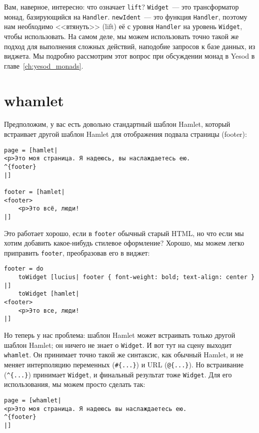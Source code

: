 \begin{remark}
Вам, наверное, интересно: что означает \lstinline'lift'? \lstinline'Widget'~--- это трансформатор монад, базирующийся на \lstinline'Handler'. \lstinline'newIdent'~--- это функция \lstinline'Handler', поэтому нам необходимо <<втянуть>> (lift) её с уровня \lstinline'Handler' на уровень \lstinline'Widget', чтобы использовать. На самом деле, мы можем использовать точно такой же подход для выполнения сложных действий, наподобие запросов к базе данных, из виджета. Мы подробно рассмотрим этот вопрос при обсуждении монад в Yesod в главе~\ref{ch:yesod_monads}.
\end{remark}

\section{whamlet}

Предположим, у вас есть довольно стандартный шаблон Hamlet, который встраивает другой шаблон Hamlet для отображения подвала страницы (footer):

\begin{lstlisting}
page = [hamlet|
<p>Это моя страница. Я надеюсь, вы наслаждаетесь ею.
^{footer}
|]

footer = [hamlet|
<footer>
    <p>Это всё, люди!
|]
\end{lstlisting}

Это работает хорошо, если в \lstinline'footer' обычный старый HTML, но что если мы хотим добавить какое-нибудь стилевое оформление? Хорошо, мы можем легко приправить \lstinline'footer', преобразовав его в виджет:

\begin{lstlisting}
footer = do
    toWidget [lucius| footer { font-weight: bold; text-align: center } |]
    toWidget [hamlet|
<footer>
    <p>Это все, люди!
|]
\end{lstlisting}

Но теперь у нас проблема: шаблон Hamlet может встраивать только другой шаблон Hamlet; он ничего не знает о \lstinline'Widget'. И вот тут на сцену выходит \lstinline'whamlet'. Он принимает точно такой же синтаксис, как обычный Hamlet, и не меняет интерполяцию переменных (\lstinline'#{...}')  и URL (\lstinline'@{...}'). Но встраивание (\lstinline'^{...}') принимает \lstinline'Widget', и финальный результат тоже \lstinline'Widget'. Для его использования, мы можем просто сделать так:

\begin{lstlisting}
page = [whamlet|
<p>Это моя страница. Я надеюсь вы наслаждаетесь ею.
^{footer}
|]
\end{lstlisting}



